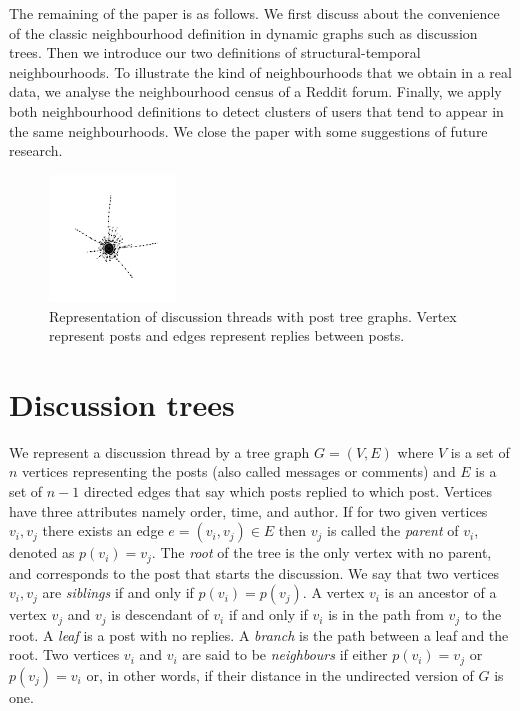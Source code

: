 \documentclass[conference]{IEEEtran}
\begin{document}
The remaining of the paper is as follows. We first discuss about the convenience of the classic neighbourhood definition in dynamic graphs such as discussion trees. Then we introduce our two definitions of structural-temporal neighbourhoods. To illustrate the kind of neighbourhoods that we obtain in a real data, we analyse the neighbourhood census of a Reddit forum. Finally, we apply both neighbourhood definitions to detect clusters of users that tend to appear in the same neighbourhoods. We close the paper with some suggestions of future research.
\begin{figure}
	\centering
	\includegraphics[width=0.3\textwidth]{tree2}
	\caption{Representation of discussion threads with post tree graphs. Vertex represent posts and edges represent replies between posts.}
	\label{fig:trees}
\end{figure}

\section{Discussion trees}
We represent a discussion thread by a tree graph $G=(V,E)$ where $V$ is a set of $n$ vertices representing the posts (also called messages or comments) and $E$ is a set of $n-1$ directed edges that say which posts replied to which post. Vertices have three attributes namely order, time, and author. If for two given vertices $v_i,v_j$ there exists an edge  $e=(v_i, v_j) \in E$ then $v_j$ is called the \textit{parent} of $v_i$, denoted as $p(v_i)=v_j$. The \textit{root} of the tree is the only vertex with no parent, and corresponds to the post that starts the discussion. We say that two vertices $v_i,v_j$ are \textit{siblings} if and only if $p(v_i)=p(v_j)$. A vertex $v_i$ is an ancestor of a vertex $v_j$ and $v_j$ is descendant of $v_i$ if and only if $v_i$ is in the path from $v_j$ to the root. A \textit{leaf} is a post with no replies. A \textit{branch} is the path between a leaf and the root. Two vertices $v_i$ and $v_i$ are said to be \textit{neighbours} if either $p(v_i)=v_j$ or $p(v_j)=v_i$ or, in other words, if their distance in the undirected version of $G$ is one.
\end{document}
